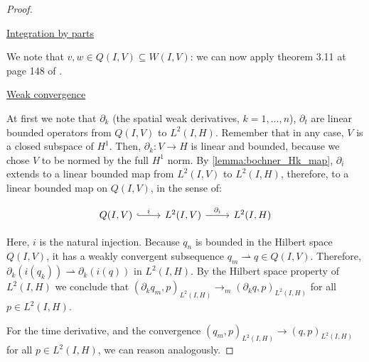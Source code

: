 \documentclass[english,a4paper,9pt,oneside]{scrbook}	%
\theoremstyle{break}
\newenvironment{mproof}[1][\proofname]{%
  \begin{proof}[#1]$ $\par\nobreak\ignorespaces
}{%
  \end{proof}
}
\renewcommand*{\proofname}{Proof}
\theoremstyle{remark}
\newcommand{\ind}[1]{\{\text{ #1 }\}}
\newcommand{\weakc}{\rightharpoonup}
\begin{document}
\begin{appendices}
\begin{mproof}
%
%
%
%
%
%
%
\underline{Integration by parts}

We note that $v,w \in Q(I,V)\subseteq W(I,V)$: we can now apply theorem 3.11 at page 148 of \cite{trol}.

\underline{Weak convergence}

At first we note that $\partial_k$ (the spatial weak derivatives, $k=1,...,n$), $\partial_t$ are linear bounded operators from $Q(I,V)$ to $L^2(I,H)$.
Remember that in any case, $V$ is a closed subspace of $H^1$. Then, $\partial_k : V\rightarrow H$ is linear and bounded, because we chose $V$ to be normed by the full $H^1$ norm.
By \cref{lemma:bochner_Hk_map}, $\partial_i$ extends to a linear bounded map from $L^2(I,V)$ to $L^2(I,H)$, therefore, to a linear bounded map on $Q(I,V)$, in the sense of:

\[\begin{tikzcd}
	{Q(I,V)} & {L^2(I,V)} & {L^2(I,H)}
	\arrow["i", hook, from=1-1, to=1-2]
	\arrow["{\partial_i}", from=1-2, to=1-3]
\end{tikzcd}\]

Here, $i$ is the natural injection. Because $q_n$ is bounded in the Hilbert space $Q(I,V)$, it has a weakly convergent subsequence $q_m\weakc q \in Q(I,V)$. Therefore, $\partial_k (i(q_k))\weakc \partial_k (i(q))$ in $L^2(I,H)$. By the Hilbert space property of $L^2(I,H)$ we conclude that $(\partial_k q_m,p)_{L^2(I,H)}\rightarrow_m (\partial_k q,p)_{L^2(I,H)}$ for all $p \in L^2(I,H)$.

For the time derivative, and the convergence $(q_m,p)_{L^2(I,H)}\rightarrow (q,p)_{L^2(I,H)}$ for all $p \in L^2(I,H)$, we can reason analogously.
\end{mproof}


\end{appendices}
\end{document}
